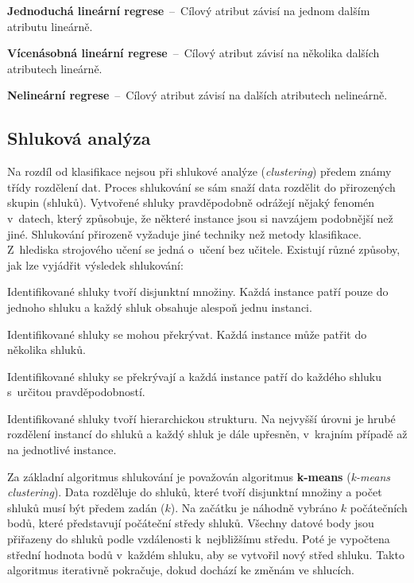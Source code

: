 \begin{compactitem}
    \item \textbf{Jednoduchá lineární regrese}~--~Cílový atribut závisí na jednom dalším atributu lineárně.

    \item \textbf{Vícenásobná lineární regrese}~--~Cílový atribut závisí na několika dalších atributech lineárně.

    \item \textbf{Nelineární regrese}~--~Cílový atribut závisí na dalších atributech nelineárně.
\end{compactitem}

\subsection{Shluková analýza}

Na rozdíl od klasifikace nejsou při shlukové analýze (\textit{clustering}) předem známy třídy rozdělení dat. Proces shlukování se sám snaží data rozdělit do přirozených skupin (shluků). Vytvořené shluky pravděpodobně odrážejí nějaký fenomén v~datech, který způsobuje, že některé instance jsou si navzájem podobnější než jiné. Shlukování přirozeně vyžaduje jiné techniky než metody klasifikace. Z~hlediska strojového učení se jedná o~učení bez učitele. Existují různé způsoby, jak lze vyjádřit výsledek shlukování:

\begin{compactitem}
    \item Identifikované shluky tvoří disjunktní množiny. Každá instance patří pouze do jednoho shluku a každý shluk obsahuje alespoň jednu instanci.

    \item Identifikované shluky se mohou překrývat. Každá instance může patřit do několika shluků.

    \item Identifikované shluky se překrývají a každá instance patří do každého shluku s~určitou pravděpodobností.

    \item Identifikované shluky tvoří hierarchickou strukturu. Na nejvyšší úrovni je hrubé rozdělení instancí do shluků a každý shluk je dále upřesněn, v~krajním případě až na jednotlivé instance.
\end{compactitem}

Za základní algoritmus shlukování je považován algoritmus \textbf{k-means} (\textit{k-means clustering}). Data rozděluje do shluků, které tvoří disjunktní množiny a počet shluků musí být předem zadán ($k$). Na začátku je náhodně vybráno $k$ počátečních bodů, které představují počáteční středy shluků. Všechny datové body jsou přiřazeny do shluků podle vzdálenosti k~nejbližšímu středu. Poté je vypočtena střední hodnota bodů v~každém shluku, aby se vytvořil nový střed shluku. Takto algoritmus iterativně pokračuje, dokud dochází ke změnám ve shlucích.

